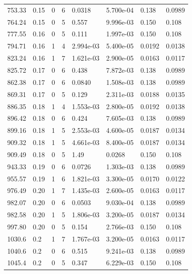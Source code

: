 \documentclass[preview]{standalone}
\begin{document}
{{{\begin{tabular}{L{1.2cm}C{1.2cm} C{0.3cm}C{0.5cm} C{1.4cm}C{1.4cm} C{1.4cm}C{1.4cm}}
  753.33  &  0.15  & 0     &  6 &  0.0318  & 5.700e-04  & 0.138 &  0.0989   \\ 
  764.24  &  0.15  & 0     &  5 &  0.557  & 9.996e-03  & 0.150 &  0.108   \\ 
  777.55  &  0.16  & 0     &  5 &  0.111  & 1.997e-03  & 0.150 &  0.108   \\ 
  794.71  &  0.16  & 1     &  4 &  2.994e-03  & 5.400e-05  & 0.0192 &  0.0138   \\ 
  823.24  &  0.16  & 1     &  7 &  1.621e-03  & 2.900e-05  & 0.0163 &  0.0117   \\ 
  825.72  &  0.17  & 0     &  6 &  0.438  & 7.872e-03  & 0.138 &  0.0989   \\ 
  862.38  &  0.17  & 0     &  6 &  0.0840  & 1.508e-03  & 0.138 &  0.0989   \\ 
  869.31  &  0.17  & 0     &  5 &  0.129  & 2.311e-03  & 0.0188 &  0.0135   \\ 
  886.35  &  0.18  & 1     &  4 &  1.553e-03  & 2.800e-05  & 0.0192 &  0.0138   \\ 
  896.42  &  0.18  & 0     &  6 &  0.424  & 7.605e-03  & 0.138 &  0.0989   \\ 
  899.16  &  0.18  & 1     &  5 &  2.553e-03  & 4.600e-05  & 0.0187 &  0.0134   \\ 
  909.32  &  0.18  & 1     &  5 &  4.661e-03  & 8.400e-05  & 0.0187 &  0.0134   \\ 
  909.49  &  0.18  & 0     &  5 &  1.49  & 0.0268  & 0.150 &  0.108   \\ 
  943.33  &  0.19  & 0     &  6 &  0.0726  & 1.303e-03  & 0.138 &  0.0989   \\ 
  955.57  &  0.19  & 1     &  6 &  1.821e-03  & 3.300e-05  & 0.0170 &  0.0122   \\ 
  976.49  &  0.20  & 1     &  7 &  1.435e-03  & 2.600e-05  & 0.0163 &  0.0117   \\ 
  982.07  &  0.20  & 0     &  6 &  0.0503  & 9.030e-04  & 0.138 &  0.0989   \\ 
  982.58  &  0.20  & 1     &  5 &  1.806e-03  & 3.200e-05  & 0.0187 &  0.0134   \\ 
  997.80  &  0.20  & 0     &  5 &  0.154  & 2.766e-03  & 0.150 &  0.108   \\ 
  1030.6  &   0.2  & 1     &  7 &  1.767e-03  & 3.200e-05  & 0.0163 &  0.0117   \\ 
  1040.6  &   0.2  & 0     &  6 &  0.515  & 9.241e-03  & 0.138 &  0.0989   \\ 
  1045.4  &   0.2  & 0     &  5 &  0.347  & 6.229e-03  & 0.150 &  0.108   \\ 

\end{tabular}}}}
\end{document}

